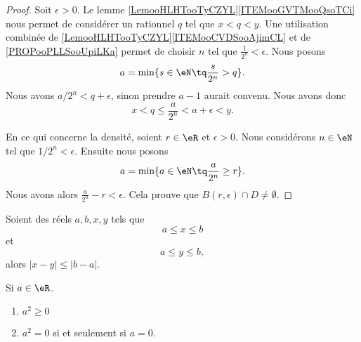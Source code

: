 \begin{proof}
	Soit \( \epsilon>0\). Le lemme \ref{LemooHLHTooTyCZYL}\ref{ITEMooGVTMooQsoTCi} nous permet de considérer un rationnel \( q\) tel que \( x<q<y\). Une utilisation combinée de \ref{LemooHLHTooTyCZYL}\ref{ITEMooCVDSooAjimCL} et de \ref{PROPooPLLSooUpiLKa} permet de choisir \( n\) tel que \( \frac{1}{ 2^n}<\epsilon\). Nous posons
	\begin{equation}
		a=\min\{ s\in \eN\tq \frac{ s }{ 2^n }>q \}.
	\end{equation}
	Nous avons \( a/2^n<q+\epsilon\), sinon prendre \( a-1\) aurait convenu. Nous avons donc
	\begin{equation}
		x<q\leq \frac{ a }{ 2^n }<a+\epsilon<y.
	\end{equation}

	En ce qui concerne la densité, soient \( r\in \eR\) et \( \epsilon>0\). Nous considérons \( n\in \eN\) tel que \( 1/2^n<\epsilon\). Ensuite nous posons
	\begin{equation}
		a=\min\{ a\in \eN\tq \frac{ a }{ 2^n }\geq r \}.
	\end{equation}
	Nous avons alors \( \frac{ a }{ 2^n }-r<\epsilon\). Cela prouve que \( B(r,\epsilon)\cap D\neq\emptyset\).
\end{proof}


\begin{lemma}        \label{LEMooEGYLooCGrDrl}
	Soient des réels \( a,b,x,y\) tels que
	\begin{equation}
		a\leq x\leq b
	\end{equation}
	et
	\begin{equation}
		a\leq y\leq b,
	\end{equation}
	alors \( | x-y |\leq | b-a |\).
\end{lemma}


\begin{lemma}       \label{LEMooNLGSooSGdvAo}
	Si \( a\in \eR\).
	\begin{enumerate}
		\item
		      \( a^2\geq 0\)
		\item
		      \( a^2=0\) si et seulement si \( a=0\).
	\end{enumerate}
\end{lemma}

